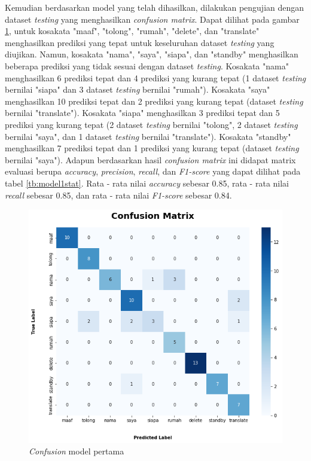 Kemudian berdasarkan model yang telah dihasilkan, dilakukan pengujian dengan dataset \emph{testing} yang menghasilkan \emph{confusion matrix}. Dapat dilihat pada gambar \ref{fig:model1-cf}, untuk kosakata "maaf", "tolong", "rumah", "delete", dan "translate" menghasilkan prediksi yang tepat untuk keseluruhan dataset \emph{testing} yang diujikan. Namun, kosakata "nama", "saya", "siapa", dan "standby" menghasilkan beberapa prediksi yang tidak sesuai dengan dataset \emph{testing}. Kosakata "nama" menghasilkan 6 prediksi tepat dan 4 prediksi yang kurang tepat (1 dataset \emph{testing} bernilai "siapa" dan 3 dataset \emph{testing} bernilai "rumah"). Kosakata "saya" menghasilkan 10 prediksi tepat dan 2 prediksi yang kurang tepat (dataset \emph{testing} bernilai "translate"). Kosakata "siapa" menghasilkan 3 prediksi tepat dan 5 prediksi yang kurang tepat (2 dataset \emph{testing} bernilai "tolong",  2 dataset \emph{testing} bernilai "saya", dan 1 dataset \emph{testing} bernilai "translate"). Kosakata "standby" menghasilkan 7 prediksi tepat dan 1 prediksi yang kurang tepat (dataset \emph{testing} bernilai "saya"). Adapun berdasarkan hasil \emph{confusion matrix} ini didapat matrix evaluasi berupa \emph{accuracy}, \emph{precision}, \emph{recall}, dan \emph{F1-score} yang dapat dilihat pada tabel \ref{tb:model1stat}. Rata - rata nilai \emph{accuracy} sebesar 0.85, rata - rata nilai \emph{recall} sebesar 0.85, dan rata - rata nilai \emph{F1-score} sebesar 0.84.

\begin{figure}[H]
  \centering

  \includegraphics[scale=0.6]{gambar/bab4-uji-model-worst-cf.png}

  \caption{\emph{Confusion} model pertama}
  \label{fig:model1-cf}
\end{figure}

